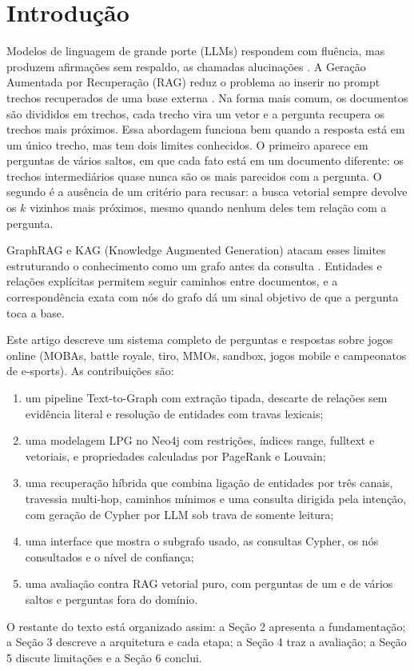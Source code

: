 \documentclass[12pt]{article}
\begin{document}
\section{Introdução}
Modelos de linguagem de grande porte (LLMs) respondem com fluência, mas produzem afirmações sem respaldo, as chamadas alucinações \cite{ji2023survey}. A Geração Aumentada por Recuperação (RAG) reduz o problema ao inserir no prompt trechos recuperados de uma base externa \cite{lewis2020rag}. Na forma mais comum, os documentos são divididos em trechos, cada trecho vira um vetor e a pergunta recupera os trechos mais próximos. Essa abordagem funciona bem quando a resposta está em um único trecho, mas tem dois limites conhecidos. O primeiro aparece em perguntas de vários saltos, em que cada fato está em um documento diferente: os trechos intermediários quase nunca são os mais parecidos com a pergunta. O segundo é a ausência de um critério para recusar: a busca vetorial sempre devolve os $k$ vizinhos mais próximos, mesmo quando nenhum deles tem relação com a pergunta.

GraphRAG e KAG (Knowledge Augmented Generation) atacam esses limites estruturando o conhecimento como um grafo antes da consulta \cite{edge2024graphrag,liang2024kag,peng2024survey}. Entidades e relações explícitas permitem seguir caminhos entre documentos, e a correspondência exata com nós do grafo dá um sinal objetivo de que a pergunta toca a base.

Este artigo descreve um sistema completo de perguntas e respostas sobre jogos online (MOBAs, battle royale, tiro, MMOs, sandbox, jogos mobile e campeonatos de e-sports). As contribuições são:

\begin{enumerate}\item um pipeline Text-to-Graph com extração tipada, descarte de relações sem evidência literal e resolução de entidades com travas lexicais;
\item uma modelagem LPG no Neo4j com restrições, índices range, fulltext e vetoriais, e propriedades calculadas por PageRank e Louvain;
\item uma recuperação híbrida que combina ligação de entidades por três canais, travessia multi-hop, caminhos mínimos e uma consulta dirigida pela intenção, com geração de Cypher por LLM sob trava de somente leitura;
\item uma interface que mostra o subgrafo usado, as consultas Cypher, os nós consultados e o nível de confiança;
\item uma avaliação contra RAG vetorial puro, com perguntas de um e de vários saltos e perguntas fora do domínio.
\end{enumerate}
O restante do texto está organizado assim: a Seção 2 apresenta a fundamentação; a Seção 3 descreve a arquitetura e cada etapa; a Seção 4 traz a avaliação; a Seção 5 discute limitações e a Seção 6 conclui.
\end{document}
